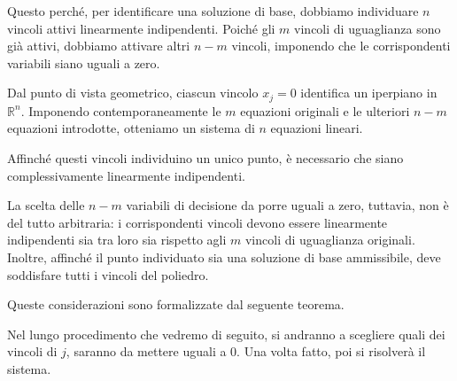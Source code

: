 Questo perché, per identificare una soluzione di base, dobbiamo individuare \(n\) vincoli attivi linearmente indipendenti. Poiché gli \(m\) vincoli di uguaglianza sono già attivi, dobbiamo attivare altri \(n-m\) vincoli, imponendo che le corrispondenti variabili siano uguali a zero.

Dal punto di vista geometrico, ciascun vincolo \(x_j=0\) identifica un iperpiano in \(\mathbb{R}^n\). Imponendo contemporaneamente le \(m\) equazioni originali e le ulteriori \(n-m\) equazioni introdotte, otteniamo un sistema di \(n\) equazioni lineari.

Affinché questi vincoli individuino un unico punto, è necessario che siano complessivamente linearmente indipendenti.

La scelta delle \(n-m\) variabili di decisione da porre uguali a zero, tuttavia, non è del tutto arbitraria: i corrispondenti vincoli devono essere linearmente indipendenti sia tra loro sia rispetto agli \(m\) vincoli di uguaglianza originali. Inoltre, affinché il punto individuato sia una soluzione di base ammissibile, deve soddisfare tutti i vincoli del poliedro.

Queste considerazioni sono formalizzate dal seguente teorema.

\begin{center}
    Nel lungo procedimento che vedremo di seguito, si andranno a scegliere quali dei vincoli di $j$, saranno da mettere uguali a 0.
    Una volta fatto, poi si risolverà il sistema.
\end{center}


